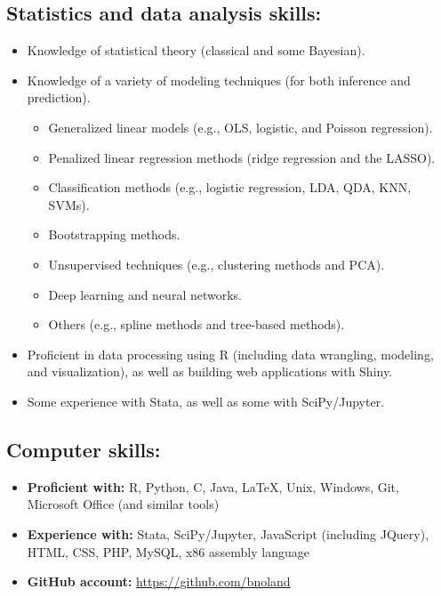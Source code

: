 \documentclass[letterpaper,12pt]{article}
\begin{document}
\subsection*{Statistics and data analysis skills:}
\begin{itemize}
\item
Knowledge of statistical theory (classical and some Bayesian).
\item
Knowledge of a variety of modeling techniques (for both inference and prediction).
\begin{itemize}
\item
Generalized linear models (e.g., OLS, logistic, and Poisson regression).
\item
Penalized linear regression methods (ridge regression and the LASSO).
\item
Classification methods (e.g., logistic regression, LDA, QDA, KNN, SVMs).
\item
Bootstrapping methods.
\item
Unsupervised techniques (e.g., clustering methods and PCA).
\item
Deep learning and neural networks.
\item
Others (e.g., spline methods and tree-based methods).
\end{itemize}
\item
Proficient in data processing using R (including data wrangling, modeling, and visualization), as 
well as building web applications with Shiny.
\item
Some experience with Stata, as well as some with SciPy/Jupyter.
\end{itemize}

\subsection*{Computer skills:}
\begin{itemize}
\item
\textbf{Proficient with:} R, Python, C, Java, \LaTeX, Unix, Windows, Git, Microsoft Office (and 
similar tools)
\item
\textbf{Experience with:} Stata, SciPy/Jupyter, JavaScript (including JQuery), HTML, CSS, PHP, 
MySQL, x86 assembly language
\item
\textbf{GitHub account:} \url{https://github.com/bnoland}
\end{itemize}
\end{document}
